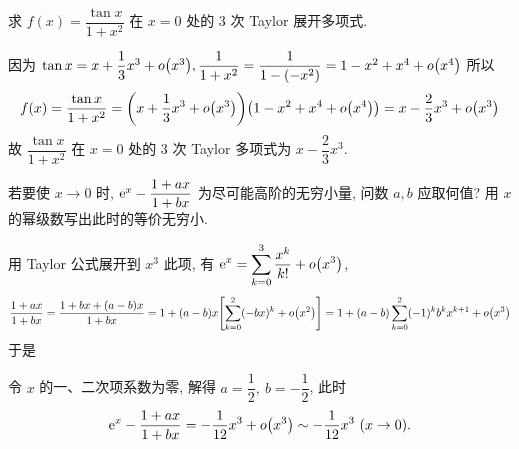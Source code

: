 \begin{example}
    求 $f(x)=\dfrac{\tan x}{1+x^2}$ 在 $x=0$ 处的 3 次 Taylor 展开多项式.
\end{example}
\begin{solution}
    因为 $\tan x=x+\dfrac{1}{3}x^3+o\qty(x^3), \dfrac{1}{1+x^2}=\dfrac{1}{1-\qty(-x^2)}=1-x^2+x^4+o\qty(x^4)$
    所以 $$
        f(x)=\dfrac{\tan x}{1+x^2}=\qty(x+\dfrac{1}{3}x^3+o\qty(x^3))\qty(1-x^2+x^4+o\qty(x^4))=x-\dfrac{2}{3}x^3+o\qty(x^3)
    $$
    故 $\dfrac{\tan x}{1+x^2}$ 在 $x=0$ 处的 3 次 Taylor 多项式为 $x-\dfrac{2}{3}x^3.$
\end{solution}

\begin{example}
    若要使 $x\to0$ 时, $\mathrm{e}^x-\dfrac{1+ax}{1+bx}$ 为尽可能高阶的无穷小量, 问数 $a,b$ 应取何值? 用 $x$ 的幂级数写出此时的等价无穷小.
\end{example}
\begin{solution}
    用 Taylor 公式展开到 $x^3$ 此项, 有 $\displaystyle\mathrm{e}^x=\sum_{k=0}^{3}\dfrac{x^k}{k!}+o\qty(x^3)$,
    $$\dfrac{1+ax}{1+bx}=\dfrac{1+bx+(a-b)x}{1+bx}=1+(a-b)x\qty[\sum_{k=0}^{2}(-bx)^k+o\qty(x^2)]=1+(a-b)\sum_{k=0}^{2}(-1)^kb^kx^{k+1}+o\qty(x^3)$$
    于是
    令 $x$ 的一、二次项系数为零, 解得 $a=\dfrac{1}{2},~b=-\dfrac{1}{2}$, 此时 $$\mathrm{e}^x-\dfrac{1+ax}{1+bx}=-\dfrac{1}{12}x^3+o\qty(x^3)\sim-\dfrac{1}{12}x^3~ (x\to0).$$
\end{solution}

